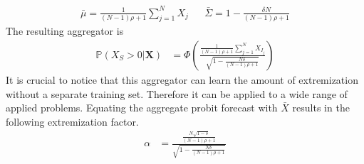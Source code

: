\documentclass[11pt,twoside]{article}
\renewcommand{\P}{\mathbb{P}}
\begin{document}
\begin{align*}
\bar{\mu} = \frac{1}{(N-1)\rho +1}  \sum_{j=1}^N X_j 
&&  \bar{\Sigma} = 1  - \frac{\delta N}{(N-1)\rho +1} 
\end{align*}
The resulting aggregator is
\begin{align*}
\P\left(X_S > 0 | \boldsymbol{X}\right) &=\Phi\left(\frac{\frac{1}{(N-1)\rho +1} \sum_{j=1}^N X_{I_j} }{\sqrt{1- \frac{N\delta}{(N-1)\rho +1} }}  \right)
\end{align*}
It is crucial to notice that this aggregator can learn the amount of extremization without a separate training set. Therefore it can be applied to a wide range of applied problems. Equating the aggregate probit forecast with $\bar{X}$ results in the following extremization factor.
\begin{align}
\alpha &= \frac{\frac{N\sqrt{1-\delta}}{(N-1)\rho +1}}{\sqrt{1- \frac{N\delta}{(N-1)\rho +1} }} \label{CompoundAlpha}
\end{align}
\end{document}

